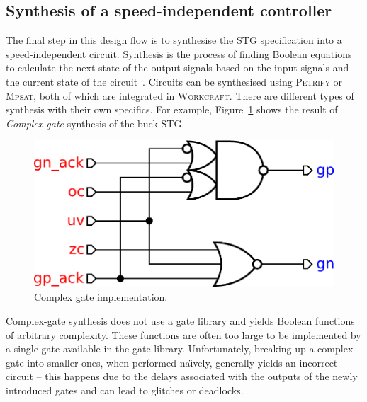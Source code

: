 \documentclass[british, journal]{IEEEtran}
\newcommand{\noun}[1]{\textsc{#1}}
\begin{document}

\subsection{Synthesis of a speed-independent controller}


The final step in this design flow is to synthesise the STG specification into
a speed-independent circuit. Synthesis is the process of finding Boolean equations
to calculate the next state of the output signals based on the input signals
and the current state of the circuit~\cite{Cortadella}. Circuits can be
synthesised using \noun{Petrify} or \noun{Mpsat}, both of which are
integrated in \noun{Workcraft}. There are different types of synthesis
with their own specifics. For example, Figure~\ref{fig:complex-gate-circuit}
shows the result of \emph{Complex gate} synthesis of the buck STG.

\begin{figure}[h]
\begin{centering}
\includegraphics[scale=0.35]{Images/complex-gate-circuit-buck}
\par\end{centering}

\protect\caption{\label{fig:complex-gate-circuit}Complex gate implementation.}
\end{figure}

Complex-gate synthesis does not use a gate library and yields Boolean functions of arbitrary complexity.
These functions are often too large to be implemented by a single gate available in the gate library.
Unfortunately, breaking up a complex-gate into smaller ones, when performed na\"{\i}vely, generally yields
an incorrect circuit -- this happens due to the delays associated with the outputs of the newly introduced gates and can lead to glitches or deadlocks.
\end{document}
